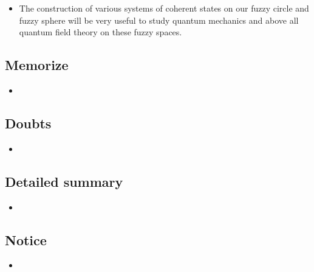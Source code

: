 \documentclass{article}
\begin{document}
    \begin{itemize}

    \item The construction of various systems of coherent states on our fuzzy circle and fuzzy sphere will be very useful to study quantum mechanics and above all quantum field theory on these fuzzy spaces.
    
    \end{itemize}

\subsection{Memorize}

    \begin{itemize}

    \item 
    
    \end{itemize}

\subsection{Doubts}

    \begin{itemize}

    \item 
    
    \end{itemize}

\subsection{Detailed summary}

    \begin{itemize}

    \item 
    
    \end{itemize}

\subsection{Notice}

    \begin{itemize}

    \item 
    
    \end{itemize}
\end{document}
